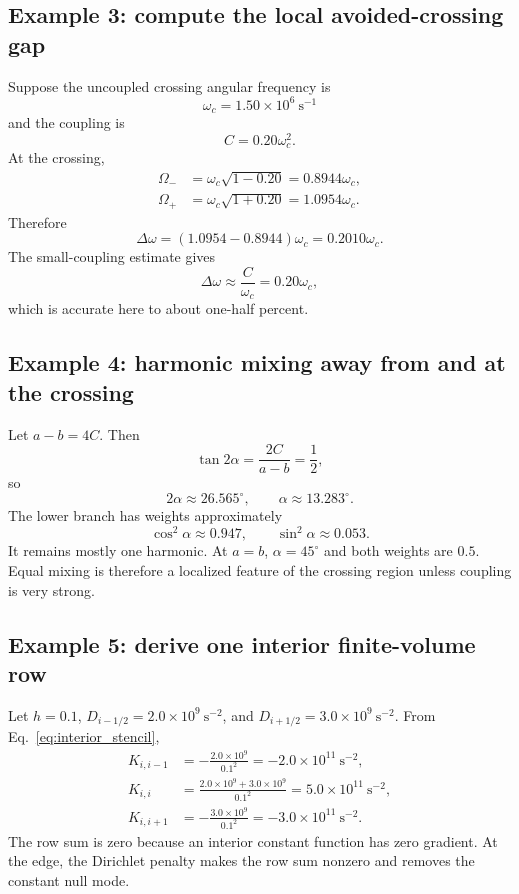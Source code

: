 \subsection{Example 3: compute the local avoided-crossing gap}
Suppose the uncoupled crossing angular frequency is
\begin{equation}
\omega_c=1.50\times10^6\ \mathrm{s^{-1}}
\end{equation}
and the coupling is
\begin{equation}
C=0.20\omega_c^2.
\end{equation}
At the crossing,
\begin{align}
\Omega_-&=\omega_c\sqrt{1-0.20}=0.8944\omega_c,\\
\Omega_+&=\omega_c\sqrt{1+0.20}=1.0954\omega_c.
\end{align}
Therefore
\begin{equation}
\Delta\omega=(1.0954-0.8944)\omega_c=0.2010\omega_c.
\end{equation}
The small-coupling estimate gives
\begin{equation}
\Delta\omega\approx\frac{C}{\omega_c}=0.20\omega_c,
\end{equation}
which is accurate here to about one-half percent.

\subsection{Example 4: harmonic mixing away from and at the crossing}
Let $a-b=4C$. Then
\begin{equation}
\tan2\alpha=\frac{2C}{a-b}=\frac{1}{2},
\end{equation}
so
\begin{equation}
2\alpha\approx26.565^\circ,
\qquad
\alpha\approx13.283^\circ.
\end{equation}
The lower branch has weights approximately
\begin{equation}
\cos^2\alpha\approx0.947,
\qquad
\sin^2\alpha\approx0.053.
\end{equation}
It remains mostly one harmonic. At $a=b$, $\alpha=45^\circ$ and both weights are $0.5$. Equal mixing is therefore a localized feature of the crossing region unless coupling is very strong.

\subsection{Example 5: derive one interior finite-volume row}
Let $h=0.1$, $D_{i-1/2}=2.0\times10^9\ \mathrm{s^{-2}}$, and $D_{i+1/2}=3.0\times10^9\ \mathrm{s^{-2}}$. From Eq.~\eqref{eq:interior_stencil},
\begin{align}
K_{i,i-1}&=-\frac{2.0\times10^9}{0.1^2}=-2.0\times10^{11}\ \mathrm{s^{-2}},\\
K_{i,i}&=\frac{2.0\times10^9+3.0\times10^9}{0.1^2}=5.0\times10^{11}\ \mathrm{s^{-2}},\\
K_{i,i+1}&=-\frac{3.0\times10^9}{0.1^2}=-3.0\times10^{11}\ \mathrm{s^{-2}}.
\end{align}
The row sum is zero because an interior constant function has zero gradient. At the edge, the Dirichlet penalty makes the row sum nonzero and removes the constant null mode.

